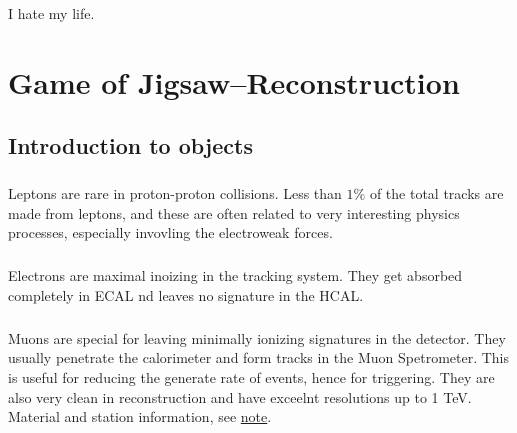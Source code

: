 \begin{savequote}[75mm]
I hate my life.
\end{savequote}

\chapter{Game of Jigsaw--Reconstruction}

\section{Introduction to objects}

\paragraph{}
Leptons are rare in proton-proton collisions. Less than $1\%$ of the total tracks are made from leptons, and these are often related to very interesting physics processes, especially invovling the electroweak forces.

\paragraph{}
Electrons are maximal inoizing in the tracking system. They get absorbed completely in ECAL nd leaves no signature in the HCAL.

\paragraph{}
Muons are special for leaving minimally ionizing signatures in the detector. They usually penetrate the calorimeter and form tracks in the Muon Spetrometer. This is useful for reducing the generate rate of events, hence for triggering. They are also very clean in reconstruction and have exceelnt resolutions up to 1 TeV. Material and station information, see \href{https://cds.cern.ch/record/2252613/files/ATL-COM-MUON-2017-005.pdf}{note}.



